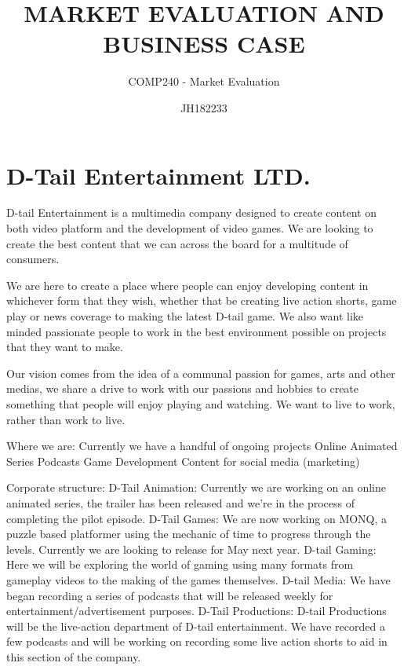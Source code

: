 \documentclass{scrartcl}
\title{MARKET EVALUATION AND BUSINESS CASE}
\subtitle{COMP240 - Market Evaluation}
\author{JH182233}
\begin{document}
	
	
	\maketitle
{}
	
\section{D-Tail Entertainment LTD.}

D-tail Entertainment is a multimedia company designed to create content on both video platform and the development of video games. We are looking to create the best content that we can across the board for a multitude of consumers. 

We are here to create a place where people can enjoy developing content in whichever form that they wish, whether that be creating live action shorts, game play or news coverage to making the latest D-tail game. We also want like minded passionate people to work in the best environment possible on projects that they want to make.

Our vision comes from the idea of a communal passion for games, arts and other medias, we share a drive to work with our passions and hobbies to create something that people will enjoy playing and watching. We want to live to work, rather than work to live. 

Where we are:
Currently we have a handful of ongoing projects 
\newline
Online Animated Series
Podcasts
Game Development
Content for social media (marketing)
\newline


Corporate structure:
D-Tail Animation:
Currently we are working on an online animated series, the trailer has been released and we’re in the process of completing the pilot episode.
\newline
D-Tail Games:
We are now working on MONQ, a puzzle based platformer using the mechanic of time to progress through the levels. Currently we are looking to release for May next year.
\newline
D-tail Gaming: 
Here we will be exploring the world of gaming using many formats from gameplay videos to the making of the games themselves.
\newline
D-tail Media:
We have began recording a series of podcasts that will be released weekly for entertainment/advertisement purposes.
\newline
D-Tail Productions:
D-tail Productions will be the live-action department of D-tail entertainment. 
We have recorded a few podcasts and will be working on recording some live action shorts to aid in this section of the company.
\end{document}

